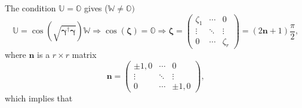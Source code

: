 \documentclass[aps, preprint]{revtex4}
\begin{document}
The condition $\mathbb{U} =\mathbb{O}$ gives ($\mathbb{W} \neq \mathbb{O})$
\begin{equation*}\mathbb{U} =\cos  \left (\sqrt{\mathbf{\gamma }^{ \dag } \mathbf{\gamma }}\right ) \mathbb{W} \Rightarrow \cos  \left (\mathbf{\zeta }\right ) =\mathbb{O} \Rightarrow \mathbf{\zeta } =\left (\begin{array}{ccc}\zeta _{1} & \cdots  & 0 \\
\vdots  & \ddots  & \vdots  \\
0 & \cdots  & \zeta _{r}\end{array}\right ) =\left (2 \mathbf{n} +1\right ) \frac{\pi }{2}\text{,}
\end{equation*}where $\mathbf{n}$ is a $r \times r$ matrix
\begin{equation}\mathbf{n} =\left (\begin{array}{ccc} \pm 1 ,0 & \cdots  & 0 \\
\vdots  & \ddots  & \vdots  \\
0 & \cdots  &  \pm 1 ,0\end{array}\right )\text{,}
\end{equation}which implies that
\end{document}
